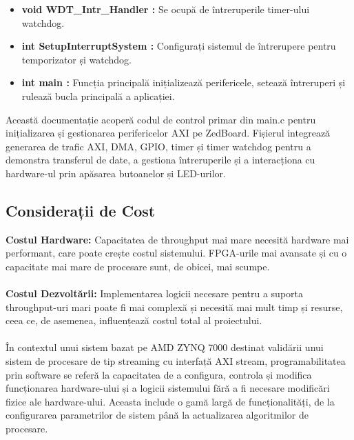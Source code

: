 \documentclass[12pt]{article}
\begin{document}
\begin{enumerate}
\begin{itemize}
            \item \textbf{void WDT\_Intr\_Handler :} Se ocupă de întreruperile timer-ului watchdog.
            \item \textbf{int SetupInterruptSystem :} Configurați sistemul de întrerupere pentru temporizator și watchdog.
            \item \textbf{int main :} Funcția principală inițializează perifericele, setează întreruperi și rulează bucla principală a aplicației.
        \end{itemize}
    \hspace*{1cm}Această documentație acoperă codul de control primar din main.c pentru inițializarea și gestionarea perifericelor AXI pe ZedBoard. Fișierul integrează generarea de trafic AXI, DMA, GPIO, timer și timer watchdog pentru a demonstra transferul de date, a gestiona întreruperile și a interacționa cu hardware-ul prin apăsarea butoanelor și LED-urilor.
\end{enumerate}



\subsection{Considerații de Cost}
\hspace*{1cm}\textbf{Costul Hardware:} Capacitatea de throughput mai mare necesită hardware mai performant, care poate crește costul sistemului. FPGA-urile mai avansate și cu o capacitate mai mare de procesare sunt, de obicei, mai scumpe.\\\\
\hspace*{1cm}\textbf{Costul Dezvoltării:} Implementarea logicii necesare pentru a suporta throughput-uri mari poate fi mai complexă și necesită mai mult timp și resurse, ceea ce, de asemenea, influențează costul total al proiectului.\\\\
\hspace*{1cm}În contextul unui sistem bazat pe AMD ZYNQ 7000 destinat validării unui sistem de procesare de tip streaming cu interfață AXI stream, programabilitatea prin software se referă la capacitatea de a configura, controla și modifica funcționarea hardware-ului și a logicii sistemului fără a fi necesare modificări fizice ale hardware-ului. Aceasta include o gamă largă de funcționalități, de la configurarea parametrilor de sistem până la actualizarea algoritmilor de procesare.
\end{document}
